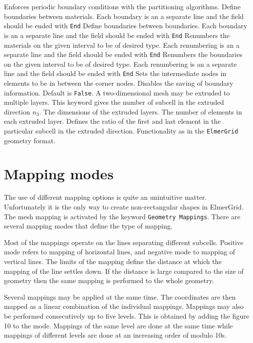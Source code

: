 Enforces periodic boundary conditions with the partitioning algorithms.
%
Define boundaries between materials. 
Each boundary is an a separate line
and the field should be ended with \texttt{End}
%
Define boundaries between boundaries.
Each boundary is an a separate line
and the field should be ended with \texttt{End}
%
Renumbers the materials on the given interval to be of desired type.
Each renumbering is an a separate line
and the field should be ended with \texttt{End}
%
Renumbers the boundaries on the given interval to be of desired type.
Each renumbering is an a separate line
and the field should be ended with \texttt{End}
%
Sets the intermediate nodes in elements to be in between 
the corner nodes.
%
Disables the saving of boundary information.
Default is \texttt{False}.
%
A two-dimensional mesh may be extruded to multiple layers. This
keyword gives the number of subcell in the extruded direction $n_3$.
The dimensions of the extruded layers.
The number of elements in each extruded layer.
Defines the ratio of the first and last element in the particular
subcell in the extruded direction.
Functionality as in the \texttt{ElmerGrid} geometry format.
%
\sifend



\section{Mapping modes}
The use of different mapping options is quite an 
unintuitive matter. Unfortunately it is the only way to 
create non-rectangular shapes in ElmerGrid. 
The mesh mapping is activated by the keyword \texttt{Geometry Mappings}.
There are several mapping modes that define the type of mapping.

Most of the mappings operate on the lines separating different subcells.
Positive mode refers to mapping of horizontal lines, 
and negative mode to mapping of vertical lines.
The limits of the mapping define the distance at which the 
mapping of the line settles down. If the distance is large compared to 
the size of geometry then the same mapping is performed to the 
whole geometry. 

Several mappings may be applied at the same time. The 
coordinates are then mapped as a linear combination of the 
individual mappings. Mappings may also be performed 
consecutively up to five levels. This is obtained by adding 
the figure 10 to the mode. Mappings of the same 
level are done at the same time while mappings of different levels
are done at an increasing order of modulo 10s.

